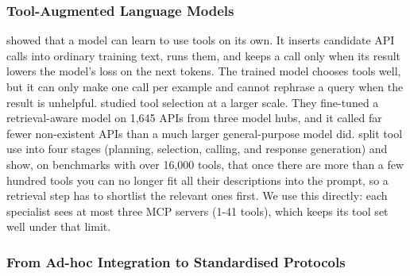 \subsubsection{Tool-Augmented Language Models}

\cite{schick_toolformer_2023} showed that a model can learn to use tools on its own. It inserts candidate API calls into ordinary training text, runs them, and keeps a call only when its result lowers the model's loss on the next tokens. The trained model chooses tools well, but it can only make one call per example and cannot rephrase a query when the result is unhelpful. \cite{patil_gorilla_2023} studied tool selection at a larger scale. They fine-tuned a retrieval-aware model on 1{,}645 APIs from three model hubs, and it called far fewer non-existent APIs than a much larger general-purpose model did. \cite{qu_tool_2024} split tool use into four stages (planning, selection, calling, and response generation) and show, on benchmarks with over 16{,}000 tools, that once there are more than a few hundred tools you can no longer fit all their descriptions into the prompt, so a retrieval step has to shortlist the relevant ones first. We use this directly: each specialist sees at most three MCP servers (1-41 tools), which keeps its tool set well under that limit.

\subsubsection{From Ad-hoc Integration to Standardised Protocols}

